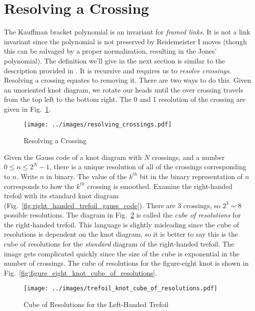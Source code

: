 \documentclass{article}
\theoremstyle{plain}
\begin{document}
    \section{Resolving a Crossing}
        The Kauffman bracket polynomial is an invariant for
        \textit{framed links}. It is not a link invariant since the polynomial
        is not preserved by Reidemeister I moves (though this can be salvaged
        by a proper normalization, resulting in the Jones' polynomial). The
        definition we'll give in the next section is similar to the
        description provided in \cite{barnatan2002khovanov}. It is recursive
        and requires us to \textit{resolve crossings}. Resolving a crossing
        equates to removing it. There are two ways to do this.
        Given an unoriented knot diagram, we rotate our heads until
        the over crossing travels from the top left to the bottom right. The
        0 and 1 resolution of the crossing are given in
        Fig.~\ref{fig:resolving_crossing}.
        \begin{figure}
            \centering
            \texttt{[image: ../images/resolving\_crossings.pdf]}
            \caption{Resolving a Crossing}
            \label{fig:resolving_crossing}
        \end{figure}
        Given the Gauss code of a knot diagram with $N$ crossings, and a number
        $0\leq{n}\leq{2}^{N}-1$, there is a unique resolution of all of the
        crossings corresponding to $n$. Write $n$ in binary. The value of the
        $k^{th}$ bit in the binary representation of $n$ corresponds to how the
        $k^{th}$ crossing is smoothed. Examine the right-handed trefoil with its
        standard knot diagram (Fig.~\ref{fig:right_handed_trefoil_gauss_code}).
        There are 3 crossings, so $2^{3}=8$ possible resolutions. The diagram
        in Fig.~\ref{fig:trefoil_knot_cube_of_resolutions} is called the
        \textit{cube of resolutions} for the right-handed
        trefoil. This language is slightly misleading since the cube of
        resolutions is dependent on the knot diagram, so it is better to say
        this is the cube of resolutions for the \textit{standard} diagram of
        the right-handed trefoil. The image gets complicated quickly since the
        size of the cube is exponential in the number of crossings. The cube of
        resolutions for the figure-eight knot is shown in
        Fig.~\ref{fig:figure_eight_knot_cube_of_resolutions}.
        \begin{figure}
            \centering
            \texttt{[image: ../images/trefoil\_knot\_cube\_of\_resolutions.pdf]}
            \caption{Cube of Resolutions for the Left-Handed Trefoil}
            \label{fig:trefoil_knot_cube_of_resolutions}
        \end{figure}
\end{document}

